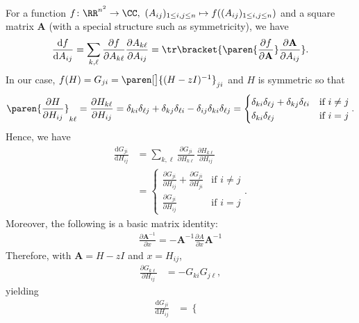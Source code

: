 \documentclass{homework}
\begin{document}
{For a function $f\colon\RR^{n^2}\to \CC,\ (A_{ij})_{1\le i,j\le n}\mapsto f((A_{ij})_{1\le i,j\le n})$ and a square matrix $\mathbf A$ (with a special structure such as symmetricity), we have
\begin{align*}
    \frac{\mathrm df}{\mathrm dA_{ij}} = \sum_{k,\ell} \frac{\partial f}{\partial A_{k\ell}} \frac{\partial A_{k\ell}}{\partial A_{ij}} = \tr\bracket{\paren{\frac{\partial f}{\partial \mathbf A}} \frac{\partial \mathbf A}{\partial A_{ij}} }.
\end{align*}
In our case, $f(H) = G_{ji} = \paren[\big]{ (H-zI)^{-1} }_{ji}$ and $H$ is symmetric so that
\begin{align*}
    \paren{ \frac{\partial H}{\partial H_{ij}}}_{k\ell} =\frac{\partial H_{k\ell}}{\partial H_{ij}} = \delta_{ki}\delta_{\ell j} + \delta_{kj}\delta_{\ell i} - \delta_{ij}\delta_{ki}\delta_{\ell j} = \begin{cases}
        \delta_{ki}\delta_{\ell j} + \delta_{kj}\delta_{\ell i} & \text{if }i\ne j \\
        \delta_{ki}\delta_{\ell j}                              & \text{if }i = j
    \end{cases}.
\end{align*}
Hence, we have
\begin{align*}
    \frac{\mathrm d G_{ji}}{\mathrm d H_{ij}} & = \sum_{k,\ell} \frac{\partial G_{ji}}{\partial H_{k\ell}}\,\frac{\partial H_{k\ell}}{\partial H_{ij}}
    \\ &=  \begin{cases}
        \displaystyle\frac{\partial G_{ji}}{\partial H_{ij}} + \frac{\partial G_{ji}}{\partial H_{ji}} & \text{if }i\ne j \\[10pt]
        \displaystyle\frac{\partial G_{ji}}{\partial H_{ij}}                                           & \text{if }i = j
    \end{cases}.
\end{align*}
Moreover, the following is a basic matrix identity:
\begin{align*}
    \frac{\partial \mathbf A^{-1}}{\partial x} = -\mathbf A^{-1} \frac{\partial A}{\partial x}\mathbf A^{-1}
\end{align*}
Therefore, with $\mathbf A = H-zI$ and $x=H_{ij}$,
\begin{align*}
    \frac{\partial G_{k\ell}}{\partial H_{ij}} & = -G_{ki}G_{j\ell},
\end{align*}
yielding
\begin{align*}
    \frac{\mathrm d G_{ji}}{\mathrm d H_{ij}} & = \begin{cases}

\end{cases}
\end{align*}}
\end{document}
